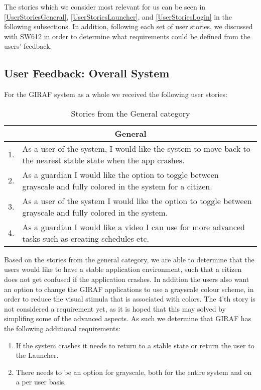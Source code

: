 The stories which we consider most relevant for us can be seen in
\autoref{UserStoriesGeneral}, \autoref{UserStoriesLauncher}, and
\autoref{UserStoriesLogin} in the following subsections. In addition, following
each set of user stories, we discussed with SW612 in order to determine what
requirements could be defined from the users' feedback.

\subsection{User Feedback: Overall System}
For the GIRAF system as a whole we received the following user stories:
\begin{table}[H]
\begin{tabular}{|c|p{12.5cm}|}
\hline 
\multicolumn{2}{|c|}{General}\\\hline
1. & As a user of the system, I would like the system to move back to the
nearest stable state when the app crashes.\\\hline
2. & As a guardian I would like the option to toggle between grayscale and fully
colored in the system for a citizen. \\ \hline
3. & As a user of the system I would like the option to toggle between grayscale
and fully colored in the system. \\\hline
4. & As a guardian I would like a video I can use for more advanced tasks such
as creating schedules etc.\\\hline
\end{tabular}
\caption{Stories from the General category}
\label{UserStoriesGeneral}
\end{table}

Based on the stories from the general category, we are able to determine that
the users would like to have a stable application environment, such that a
citizen does not get confused if the application crashes. In addition the users
also want an option to change the GIRAF applications to use a grayscale colour
scheme, in order to reduce the visual stimula that is associated with colors.
The 4'th story is not considered a requirement yet, as it is hoped that this may
solved by simplifing some of the advanced aspects. As such we determine that
GIRAF has the following additional requirements:
\begin{enumerate}
  \item If the system crashes it needs to return to a stable state or return the
  user to the Launcher.
  \item There needs to be an option for grayscale, both for the entire system
  and on a per user basis.
\end{enumerate}

